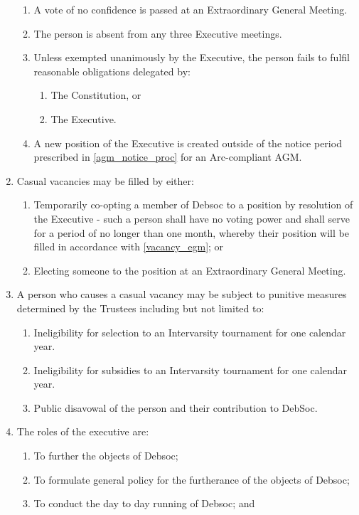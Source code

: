 \begin{enumerate}
\begin{enumerate}
  \item A vote of no confidence is passed at an Extraordinary General Meeting.
  \item The person is absent from any three Executive meetings.
  \item Unless exempted unanimously by the Executive, the person fails to fulfil reasonable obligations delegated by:
    \begin{enumerate}
    \item The Constitution, or
    \item The Executive.
    \end{enumerate}
  \item A new position of the Executive is created outside of the notice period prescribed in \ref{agm_notice_proc} for an Arc-compliant AGM.
  \end{enumerate}
\item Casual vacancies may be filled by either:
  \begin{enumerate}
  \item Temporarily co-opting a member of Debsoc to a position by resolution of the Executive - such a person shall have no voting power and shall serve for a period of no longer than one month, whereby their position will be filled in accordance with \ref{vacancy_egm}; or
  \item Electing someone to the position at an Extraordinary General Meeting. \label{vacancy_egm}
  \end{enumerate}
\item A person who causes a casual vacancy may be subject to punitive measures determined by the Trustees including but not limited to:
  \begin{enumerate}
  \item Ineligibility for selection to an Intervarsity tournament for one calendar year.
  \item Ineligibility for subsidies to an Intervarsity tournament for one calendar year.
  \item Public disavowal of the person and their contribution to DebSoc.
  \end{enumerate}
\item The roles of the executive are:
  \begin{enumerate}
  \item To further the objects of Debsoc;
  \item To formulate general policy for the furtherance of the objects of Debsoc;
  \item To conduct the day to day running of Debsoc; and

\end{enumerate}
\end{enumerate}
